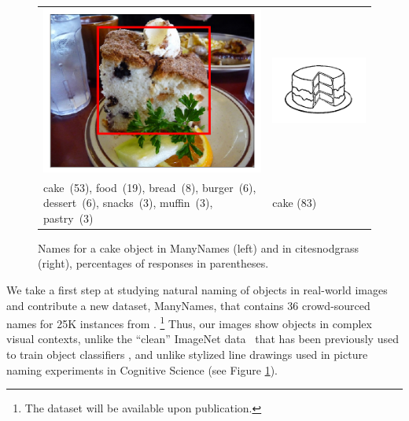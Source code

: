 \begin{figure}[tbp]
\scriptsize
\begin{tabular}{p{4.3cm}p{2cm}}
\centering
\includegraphics[scale=0.15]{figures/2390077_1254219_supercat_unique.png} &
\includegraphics[scale=0.4]{figures/snodgrass_vanderwart_cake_042.png}\\
 cake\ (53),  food\ (19), bread\ (8), burger\ (6), dessert\ (6), snacks\ (3), muffin\ (3),  pastry\ (3) & \hspace{.9cm} cake (83)
\end{tabular}
\caption{Names for a cake object in ManyNames (left) and in cite{snodgrass} (right), percentages of responses in parentheses.}
\label{fig:cake}
\end{figure}


We take a first step at studying natural naming of objects in real-world images and contribute a new dataset, ManyNames, that contains 36 crowd-sourced names for 25K instances from \vg.%
\footnote{The dataset will be available upon publication.}
Thus, our images show objects in complex visual contexts,
unlike the ``clean'' ImageNet data~\cite{imagenet_cvpr09} that has been previously used to train object classifiers \cite{ILSVRC15}, and unlike stylized line drawings used in picture naming experiments in Cognitive Science (see Figure \ref{fig:cake}).

